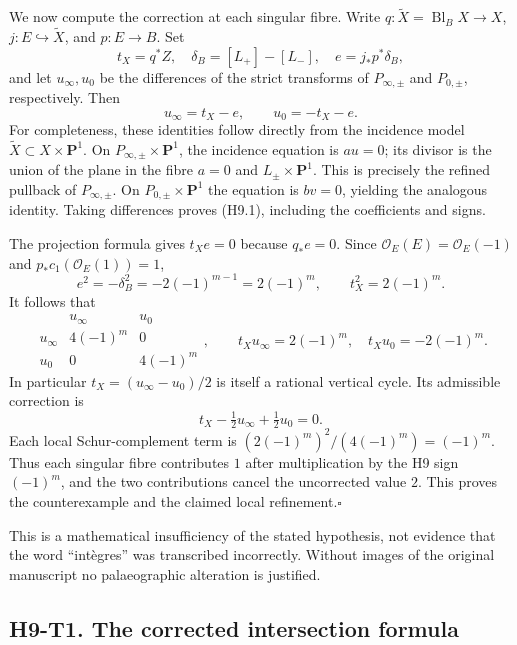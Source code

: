 We now compute the correction at each singular fibre. Write
$q:\widetilde X=\operatorname{Bl}_{B}X\to X$,
$j:E\hookrightarrow\widetilde X$, and $p:E\to B$. Set
\[
 t_X=q^*Z,\quad \delta_B=[L_+]-[L_-],\quad
 e=j_*p^*\delta_B,
\]
and let $u_\infty,u_0$ be the differences of the strict transforms of
$P_{\infty,\pm}$ and $P_{0,\pm}$, respectively. Then
\[
 u_\infty=t_X-e,\qquad u_0=-t_X-e.                 \tag{H9.1}
\]
For completeness, these identities follow directly from the incidence
model $\widetilde X\subset X\times\mathbf P^1$. On
$P_{\infty,\pm}\times\mathbf P^1$, the incidence equation is $a u=0$;
its divisor is the union of the plane in the fibre $a=0$ and
$L_\pm\times\mathbf P^1$. This is precisely the refined pullback of
$P_{\infty,\pm}$. On $P_{0,\pm}\times\mathbf P^1$ the equation is
$b v=0$, yielding the analogous identity. Taking differences proves
(H9.1), including the coefficients and signs.

The projection formula gives $t_X e=0$ because $q_*e=0$. Since
$\mathcal O_E(E)=\mathcal O_E(-1)$ and $p_*c_1(\mathcal O_E(1))=1$,
\[
 e^2=-\delta_B^2=-2(-1)^{m-1}=2(-1)^m,
 \qquad t_X^2=2(-1)^m.
\]
It follows that
\[
 \begin{array}{c|cc}
  &u_\infty&u_0\\\hline
 u_\infty&4(-1)^m&0\\
 u_0&0&4(-1)^m
 \end{array},\qquad
 t_Xu_\infty=2(-1)^m,\quad t_Xu_0=-2(-1)^m.
                                                        \tag{H9.2}
\]
In particular $t_X=(u_\infty-u_0)/2$ is itself a rational vertical cycle.
Its admissible correction is
\[
 t_X-\tfrac12u_\infty+\tfrac12u_0=0.
\]
Each local Schur-complement term is
$(2(-1)^m)^2/(4(-1)^m)=(-1)^m$. Thus each singular fibre contributes $1$
after multiplication by the H9 sign $(-1)^m$, and the two contributions
cancel the uncorrected value $2$. This proves the counterexample and the
claimed local refinement.\hfill$\square$

This is a mathematical insufficiency of the stated hypothesis, not evidence
that the word ``int\`egres'' was transcribed incorrectly. Without images of
the original manuscript no palaeographic alteration is justified.

\subsection*{H9-T1. The corrected intersection formula}

